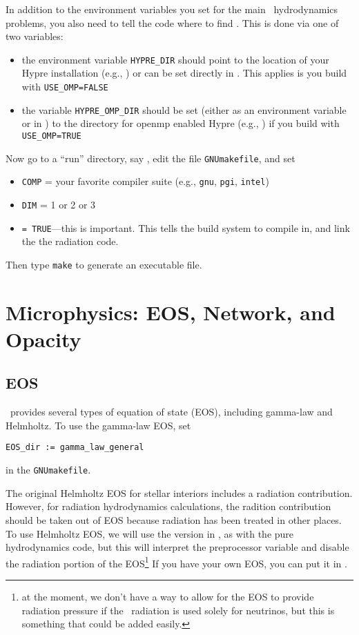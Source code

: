 In addition to the environment variables you set for the main
\castro\ hydrodynamics problems, you also need to tell the code
where to find \hypre.  This is done via one of two variables:
\begin{itemize}
\item the environment variable {\tt HYPRE\_DIR} should
  point to the location of your Hypre installation
  (e.g., {\tt{}}) or
  can be set directly in 
  {\tt{}}.
  This applies is you build with {\tt USE\_OMP=FALSE}

\item the variable {\tt HYPRE\_OMP\_DIR} should be set (either as an
  environment variable or in
  {\tt{}}) to the directory
  for openmp enabled Hypre (e.g.,
  {\tt{}}) if you build with {\tt
    USE\_OMP=TRUE}
\end{itemize}

Now go to a ``run'' directory, say
{\tt{}},
edit the file {\tt GNUmakefile}, and set
\begin{itemize}
\item {\tt COMP} = your favorite compiler suite (e.g., {\tt gnu}, {\tt pgi}, {\tt intel})
\item {\tt DIM}   = 1 or 2 or 3
\item {} {\tt = TRUE}---this is important.  This tells the build system to
  compile in, and link the the radiation code.
\end{itemize}
Then type {\tt make} to generate an executable file.

\section{Microphysics: EOS, Network, and Opacity}

\subsection{EOS}

\castro\ provides several types of equation of state (EOS), including
gamma-law and Helmholtz.  To use the gamma-law EOS, set
\begin{verbatim}
EOS_dir := gamma_law_general
\end{verbatim}
in the {\tt GNUmakefile}.

The original Helmholtz EOS for stellar interiors includes a radiation
contribution.  However, for radiation hydrodynamics calculations, the
radition contribution should be taken out of EOS because radiation has
been treated in other places.  To use Helmholtz EOS, we will use the
version in \microphysics, as with the pure hydrodynamics code, but
this will interpret the  preprocessor variable and
disable the radiation portion of the EOS\footnote{at the moment, we
  don't have a way to allow for the EOS to provide radiation pressure
  if the \castro\ radiation is used solely for neutrinos, but this is
  something that could be added easily.}  If you have your own EOS, you
can put it in \microphysics.


